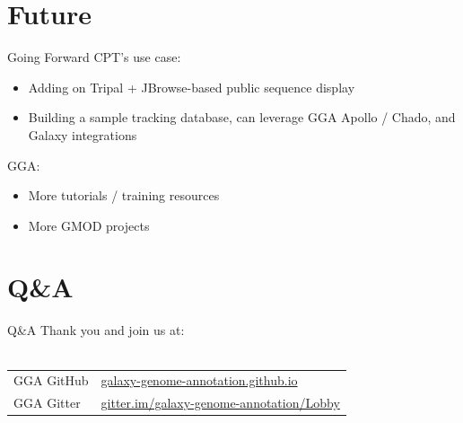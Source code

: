 \documentclass[12pt]{phage3slides} %
\begin{document}
\section{Future}
\begin{frame}{Going Forward}
    CPT's use case:
    \begin{itemize}
        \item Adding on Tripal + JBrowse-based public sequence display
        \item Building a sample tracking database, can leverage GGA Apollo / Chado, and Galaxy integrations
    \end{itemize}
    GGA:
    \begin{itemize}
        \item More tutorials / training resources
        \item More GMOD projects
    \end{itemize}
\end{frame}







\section{Q\&A}
\begin{frame}{Q\&A}
    Thank you and join us at:\\\ \\
    \begin{center}
        \begin{tabular}{ll}
            \color{gray} GGA GitHub & \href{https://galaxy-genome-annotation.github.io/}{galaxy-genome-annotation.github.io}\\
            \color{gray} GGA Gitter & \href{https://gitter.im/galaxy-genome-annotation/Lobby}{gitter.im/galaxy-genome-annotation/Lobby}\\
            \end{tabular}\\[1cm]
            \fundingNSFABIannotation
    \end{center}
\end{frame}
\end{document}
